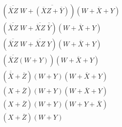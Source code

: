 \documentclass[12pt,letterpaper]{article}
\begin{document}
\begin{enumerate}
\begin{align*}
        \left(\overline{\overline{X}Z}\;W + \overline{(\overline{X}Z + \overline{Y})}\right)(W + \overline{X} + Y) \tag{Involution}\\
        \left(\overline{\overline{X}Z}\;W + \overline{\overline{X}Z}\;\overline{\overline{Y}}\right)(W + \overline{X} + Y) \tag{De Morgan's}\\
        \left(\overline{\overline{X}Z}\;W + \overline{\overline{X}Z}\;Y\right)(W + \overline{X} + Y) \tag{Involution}\\
        \left(\overline{\overline{X}Z}(W + Y)\right)(W + \overline{X} + Y) \tag{Distributivity}\\
        (\overline{\overline{X}} + \overline{Z})(W + Y)(W + \overline{X} + Y) \tag{De Morgan's}\\
        (X + \overline{Z})(W + Y)(W + \overline{X} + Y) \tag{Involution}\\
        (X + \overline{Z})(W + Y)(W + Y + \overline{X}) \tag{Commutativity}\\
        (X + \overline{Z})(W + Y) \tag{Covering}\\
      \end{align*}
  \end{enumerate}
\end{document}
